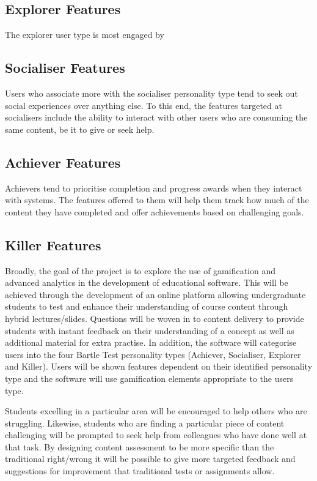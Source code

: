 \documentclass{report}
\begin{document}
\subsection*{Explorer Features}
The explorer user type is most engaged by 
\subsection*{Socialiser Features}
Users who associate more with the socialiser personality type tend to seek out social experiences over anything else. To this end, the features targeted at socialisers include the ability to interact with other users who are consuming the same content, be it to give or seek help.
\subsection*{Achiever Features}
Achievers tend to prioritise completion and progress awards when they interact with systems. The features offered to them will help them track how much of the content they have completed and offer achievements based on challenging goals.
\subsection*{Killer Features}

Broadly, the goal of the project is to explore the use of gamification and advanced analytics in the development of educational software. This will be achieved through the development of an online platform allowing undergraduate students to test and enhance their understanding of course content through hybrid lectures/slides. Questions will be woven in to content delivery to provide students with instant feedback on their understanding of a concept as well as additional material for extra practise. In addition, the software will categorise users into the four Bartle Test personality types (Achiever, Socialiser, Explorer and Killer). Users will be shown features dependent on their identified personality type and the software will use gamification elements appropriate to the users type.

Students excelling in a particular area will be encouraged to help others who are struggling. Likewise, students who are finding a particular piece of content challenging will be prompted to seek help from colleagues who have done well at that task. By designing content assessment to be more specific than the traditional right/wrong it will be possible to give more targeted feedback and suggestions for improvement that traditional tests or assignments allow.
\end{document}
